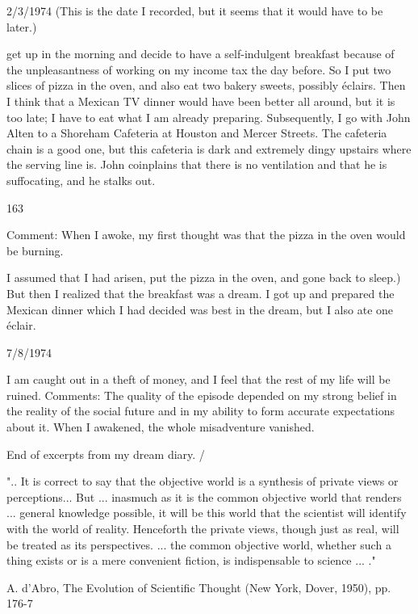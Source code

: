 \documentclass[10pt,twoside]{memoir}
\begin{document}
\begin{enumerate}
{\begin{enumerate}
\begin{sysrules}
\begin{sysrules}
\begin{sysrules}
\begin{sysrules}
{\begin{enumerate}
{{{{{{{2/3/1974 (This is the date I recorded, but it seems that it would have to be 
later.) 

} get up in the morning and decide to have a self-indulgent breakfast 
because of the unpleasantness of working on my income tax the day before. 
So I put two slices of pizza in the oven, and also eat two bakery sweets, 
possibly éclairs. Then I think that a Mexican TV dinner would have been 
better all around, but it is too late; I have to eat what I am already preparing. 
Subsequently, I go with John Alten to a Shoreham Cafeteria at Houston and 
Mercer Streets. The cafeteria chain is a good one, but this cafeteria is dark 
and extremely dingy upstairs where the serving line is. John coinplains that 
there is no ventilation and that he is suffocating, and he stalks out. 


163 


Comment: When I awoke, my first thought was that the pizza in the oven 
would be burning. {I assumed that I had arisen, put the pizza in the oven, 
and gone back to sleep.) But then I realized that the breakfast was a dream. I 
got up and prepared the Mexican dinner which I had decided was best in the 
dream, but I also ate one éclair. 


7/8/1974 

I am caught out in a theft of money, and I feel that the rest of my life 
will be ruined. Comments: The quality of the episode depended on my 
strong belief in the reality of the social future and in my ability to form 
accurate expectations about it. When I awakened, the whole misadventure 
vanished. 


End of excerpts from my dream diary. / 


".. It is correct to say that the objective world is a synthesis of private views 
or perceptions... But ... inasmuch as it is the common objective world that 
renders ... general knowledge possible, it will be this world that the scientist 
will identify with the world of reality. Henceforth the private views, though 
just as real, will be treated as its perspectives. ... the common objective 
world, whether such a thing exists or is a mere convenient fiction, is 
indispensable to science ... ." 

A. d'Abro, The Evolution of Scientific Thought (New York, Dover, 1950), 
pp. 176-7 


}}}}}}}
\end{enumerate}}
\end{sysrules}
\end{sysrules}
\end{sysrules}
\end{sysrules}
\end{enumerate}}
\end{enumerate}
\end{document}
